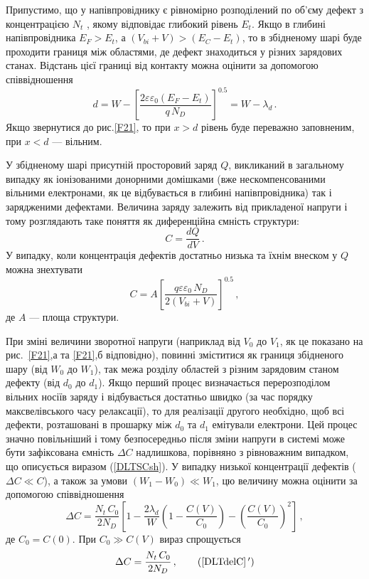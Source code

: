 Припустимо, що у напівпровіднику є рівномірно розподілений по об'єму дефект з концентрацією $N_t$ , якому
відповідає глибокий рівень $E_t$.
Якщо в глибині напівпровідника $E_F>E_t$, а $(V_{bi}+V)>(E_C-E_t)$,
то в збідненому шарі буде проходити границя між  областями, де дефект знаходиться у різних зарядових станах.
Відстань цієї границі від контакту можна оцінити за допомогою співвідношення
\begin{equation}
d=W-\left[\frac{2\varepsilon\varepsilon_0(E_F-E_t)}{q\,N_D}\right]^{0.5}=W-\lambda_d\,.
\end{equation}
Якщо звернутися до рис.\ref{F21}, то при $x>d$
рівень буде переважно заповненим, при $x<d$ --- вільним.

У збідненому шарі присутній просторовий заряд $Q$, викликаний в загальному випадку
як іонізованими донорними домішками
(вже нескомпенсованими вільними електронами, як це відбувається в глибині напівпровідника)
так і зарядженими дефектами.
Величина заряду залежить від прикладеної напруги і тому розглядають таке поняття як диференційна
ємність структури:
\begin{equation}
\label{DLTSC}
C=\frac{dQ}{dV}\,.
\end{equation}
У випадку, коли концентрація дефектів достатньо низька та їхнім внеском у $Q$ можна знехтувати
\begin{equation}
\label{DLTSCsh}
C=A\left[\frac{q\varepsilon\varepsilon_0\,N_D}{2(V_{bi}+V)}\right]^{0.5}\,,
\end{equation}
де
$A$ --- площа структури.

При зміні величини зворотної напруги (наприклад від $V_0$ до $V_1$,
як це показано на рис.~\ref{F21},а та \ref{F21},б відповідно),
повинні зміститися як границя збідненого шару (від $W_0$ до $W_1$),
так межа розділу областей з різним зарядовим станом дефекту (від $d_0$ до $d_1$).
Якщо перший процес визначається перерозподілом
вільних носіїв заряду і відбувається достатньо швидко (за час порядку максвелівського часу релаксації),
то для реалізації другого необхідно, щоб всі дефекти, розташовані в прошарку
між $d_0$ та $d_1$ емітували електрони.
Цей процес значно повільніший і тому безпосередньо після зміни напруги
в системі може бути зафіксована ємність $\Delta C$ надлишкова, порівняно з рівноважним випадком, що
описується виразом (\ref{DLTSCsh}).
У випадку низької концентрації дефектів ($\Delta C\ll C$), а також за умови $(W_1-W_0)\ll W_1$,
цю величину можна оцінити за допомогою співвідношення \cite{tuomisto2019}
\begin{equation}
\label{DLTdelC}
\Delta C=\frac{N_t\,C_0}{2N_D}\left[1-\frac{2\lambda_d}{W}\left(1-\frac{C(V)}{C_0}\right)-\left(\frac{C(V)}{C_0}\right)^2\right]\,,
\end{equation}
де
$C_0=C(0)$.
При $C_0\gg C(V)$ вираз спрощується
\begin{equation}
\label{DLTdelC*}
\Delta C=\frac{N_t\,C_0}{2N_D} \,,\tag{\ref{DLTdelC}\,$'$}
\end{equation}

